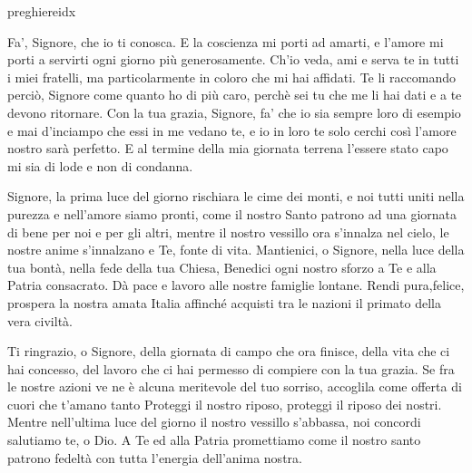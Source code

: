 \documentclass[a4paper,12pt, twoside]{article}
\begin{document}
\begin{songs}{preghiereidx}
\endverse
\endsong

\beginverse
Fa’, Signore, che io ti conosca.
E la coscienza mi porti ad amarti,
e l’amore mi porti a servirti ogni giorno più generosamente.
Ch’io veda, ami e serva te in tutti i miei fratelli,
ma particolarmente in coloro che mi hai affidati.
Te li raccomando perciò, Signore
come quanto ho di più caro,
perchè sei tu che me li hai dati
e a te devono ritornare.
Con la tua grazia, Signore,
fa’ che io sia sempre loro di esempio e mai d’inciampo
che essi in me vedano te, e io in loro te solo cerchi
così l’amore nostro sarà perfetto.
E al termine della mia giornata terrena
l’essere stato capo mi sia di lode e non di condanna.

\endverse
\endsong

\begin{intersong}
\bigskip
\end{intersong}



\beginverse
Signore, la prima luce del giorno rischiara le cime dei monti,
e noi tutti uniti nella purezza e nell’amore siamo pronti,
come il nostro Santo patrono ad una giornata di bene per noi e per 
gli altri, mentre il nostro vessillo ora s’innalza nel cielo,
le nostre anime s’innalzano e Te, fonte di vita.
Mantienici, o Signore, nella luce della tua bontà,
nella fede della tua Chiesa,
Benedici ogni nostro sforzo a Te e alla Patria consacrato.
Dà pace e lavoro alle nostre famiglie lontane.
Rendi pura,felice, prospera
la nostra amata Italia
affinché acquisti tra le nazioni il primato della vera civiltà.
\endverse
\endsong

\beginverse
Ti ringrazio, o Signore,
della giornata di campo che ora finisce,
della vita che ci hai concesso,
del lavoro che ci hai permesso di compiere con la tua grazia.
Se fra le nostre azioni ve ne è alcuna meritevole del tuo sorriso,
accoglila come offerta di cuori che t’amano tanto
Proteggi il nostro riposo, proteggi il riposo dei nostri.
Mentre nell’ultima luce del giorno il nostro vessillo s’abbassa,
noi concordi salutiamo te, o Dio.
A Te ed alla Patria promettiamo come il nostro santo patrono
fedeltà con tutta l’energia dell’anima nostra.

\endverse
\endsong

\begin{intersong}
\bigskip
\end{intersong}



\end{songs}
\end{document}
